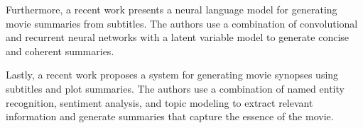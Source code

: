 \documentclass[fleqn,moreauthors,10pt]{ds_report}
\begin{document}
Furthermore, a recent work \cite{chen2019generating} presents a neural language model for generating movie summaries from subtitles. The authors use a combination of convolutional and recurrent neural networks with a latent variable model to generate concise and coherent summaries.

Lastly, a recent work \cite{jhanwar2020movie} proposes a system for generating movie synopses using subtitles and plot summaries. The authors use a combination of named entity recognition, sentiment analysis, and topic modeling to extract relevant information and generate summaries that capture the essence of the movie.






 
\end{document}
